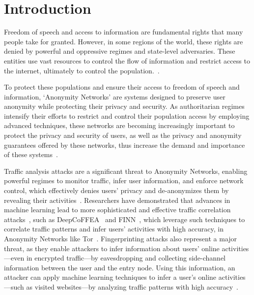 
%

\chapter{Introduction}\label{cha:introduction}

Freedom of speech and access to information are fundamental rights that many people take for granted. However, in some regions of the world, these rights are denied by powerful and oppressive regimes and state-level adversaries. These entities use vast resources to control the flow of information and restrict access to the internet, ultimately to control the population.~\cite*{aryan2013internet, zittrain2017shifting, alimardani2018internet}. 

To protect these populations and ensure their access to freedom of speech and information, `Anonymity Networks' are systems designed to preserve user anonymity while protecting their privacy and security. 
As authoritarian regimes intensify their efforts to restrict and control their population access by employing advanced techniques, these networks are becoming increasingly important to protect the privacy and security of users, as well as the privacy and anonymity guarantees offered by these networks, thus increase the demand and importance of these systems~\cite*{Groove, Karaoke, Loopix,Stadium, NetShaper}.

Traffic analysis attacks are a significant threat to Anonymity Networks, enabling powerful regimes to monitor traffic, infer user information, and enforce network control, which effectively denies users' privacy and de-anonymizes them by revealing their activities~\cite*{chakravarty2014trafficanalysis, winter2012great, robjansen2019dosontor}.
Researchers have demonstrated that advances in machine learning lead to more sophisticated and effective traffic correlation attacks~\cite*{DeepCorr, TorMarker, TirDeanon}, such as DeepCoFFEA~\cite{DeepCoFFEA} and FINN~\cite{FINN}, which leverage such techniques to correlate traffic patterns and infer users' activities with high accuracy, in Anonymity Networks like Tor~\cite{johnson2013users}.
Fingerprinting attacks also represent a major threat, as they enable attackers to infer information about users' online activities—even in encrypted traffic—by eavesdropping and collecting side-channel information between the user and the entry node.
Using this information, an attacker can apply machine learning techniques to infer a user's online activities—such as visited websites—by analyzing traffic patterns with high accuracy~\cite*{DeepFingerprinting, TikTok, OnlineWebFingerprinting}.

